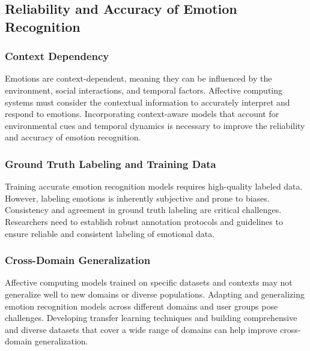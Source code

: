 \subsection{Reliability and Accuracy of Emotion Recognition}
\subsubsection{Context Dependency}
Emotions are context-dependent, meaning they can be influenced by the environment, social interactions, and temporal factors. 
Affective computing systems must consider the contextual information to accurately interpret and respond to emotions. 
Incorporating context-aware models that account for environmental cues and temporal 
dynamics is necessary to improve the reliability and accuracy of emotion recognition.
\subsubsection{Ground Truth Labeling and Training Data}
Training accurate emotion recognition models requires high-quality labeled data. However, labeling emotions is inherently subjective and prone to biases. 
Consistency and agreement in ground truth labeling are critical challenges.
Researchers need to establish robust annotation protocols and guidelines to ensure reliable and consistent labeling of emotional data.
\subsubsection{Cross-Domain Generalization}
Affective computing models trained on specific datasets and contexts may not generalize well to new domains or diverse populations. 
Adapting and generalizing emotion recognition models across different domains and user groups pose challenges. 
Developing transfer learning techniques and building comprehensive and diverse datasets that cover a wide range of domains can help improve cross-domain generalization.